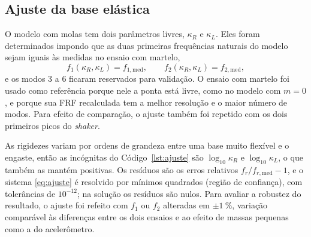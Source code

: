 
\subsection{Ajuste da base elástica}
\label{sec:met_ajuste}

O modelo com molas tem dois parâmetros livres, $\kappa_R$ e $\kappa_L$. Eles foram
determinados impondo que as duas primeiras frequências naturais do modelo sejam iguais
às medidas no ensaio com martelo,
\begin{equation}
    f_1(\kappa_R, \kappa_L) = f_{1,\mathrm{med}}, \qquad
    f_2(\kappa_R, \kappa_L) = f_{2,\mathrm{med}},
    \label{eq:ajuste}
\end{equation}
e os modos 3 a 6 ficaram reservados para validação. O ensaio com martelo foi usado
como referência porque nele a ponta está livre, como no modelo com $m = 0$, e porque
sua FRF recalculada tem a melhor resolução e o maior número de modos. Para efeito de
comparação, o ajuste também foi repetido com os dois primeiros picos do
\emph{shaker}.

As rigidezes variam por ordens de grandeza entre uma base muito flexível e o engaste,
então as incógnitas do Código~\ref{lst:ajuste} são $\log_{10}\kappa_R$ e
$\log_{10}\kappa_L$, o que também as mantém positivas. Os resíduos são os erros
relativos $f_r/f_{r,\mathrm{med}} - 1$, e o sistema \eqref{eq:ajuste} é resolvido por
mínimos quadrados (região de confiança), com tolerâncias de $10^{-12}$; na solução os
resíduos são nulos. Para avaliar a robustez do resultado, o ajuste foi refeito com
$f_1$ ou $f_2$ alteradas em $\pm\SI{1}{\percent}$, variação comparável às diferenças
entre os dois ensaios e ao efeito de massas pequenas como a do acelerômetro.


\FloatBarrier
